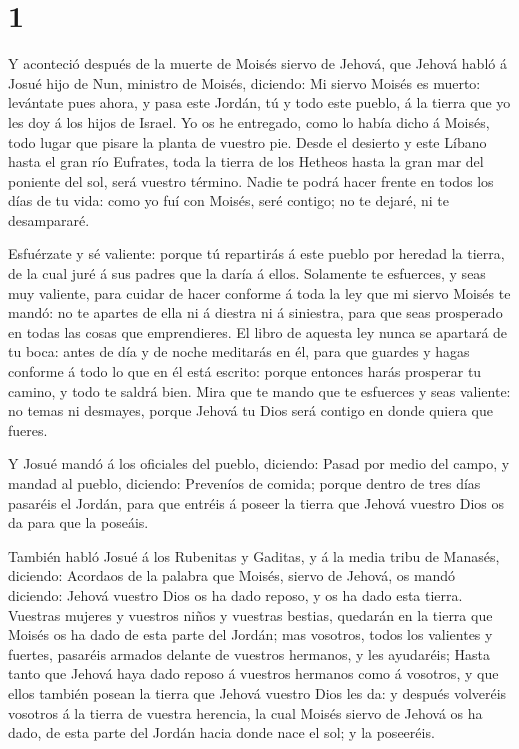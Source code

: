 \hypertarget{section}{%
\section{1}\label{section}}

 Y aconteció después de la muerte de Moisés siervo de
Jehová, que Jehová habló á Josué hijo de Nun, ministro de Moisés,
diciendo:  Mi siervo Moisés es muerto: levántate pues ahora,
y pasa este Jordán, tú y todo este pueblo, á la tierra que yo les doy á
los hijos de Israel.  Yo os he entregado, como lo había
dicho á Moisés, todo lugar que pisare la planta de vuestro pie.
 Desde el desierto y este Líbano hasta el gran río Eufrates,
toda la tierra de los Hetheos hasta la gran mar del poniente del sol,
será vuestro término.  Nadie te podrá hacer frente en todos
los días de tu vida: como yo fuí con Moisés, seré contigo; no te dejaré,
ni te desampararé.

 Esfuérzate y sé valiente: porque tú repartirás á este
pueblo por heredad la tierra, de la cual juré á sus padres que la daría
á ellos.  Solamente te esfuerces, y seas muy valiente, para
cuidar de hacer conforme á toda la ley que mi siervo Moisés te mandó: no
te apartes de ella ni á diestra ni á siniestra, para que seas prosperado
en todas las cosas que emprendieres.  El libro de aquesta
ley nunca se apartará de tu boca: antes de día y de noche meditarás en
él, para que guardes y hagas conforme á todo lo que en él está escrito:
porque entonces harás prosperar tu camino, y todo te saldrá bien.
 Mira que te mando que te esfuerces y seas valiente: no
temas ni desmayes, porque Jehová tu Dios será contigo en donde quiera
que fueres.

 Y Josué mandó á los oficiales del pueblo, diciendo:
 Pasad por medio del campo, y mandad al pueblo, diciendo:
Preveníos de comida; porque dentro de tres días pasaréis el Jordán, para
que entréis á poseer la tierra que Jehová vuestro Dios os da para que la
poseáis.

 También habló Josué á los Rubenitas y Gaditas, y á la
media tribu de Manasés, diciendo:  Acordaos de la palabra
que Moisés, siervo de Jehová, os mandó diciendo: Jehová vuestro Dios os
ha dado reposo, y os ha dado esta tierra.  Vuestras mujeres
y vuestros niños y vuestras bestias, quedarán en la tierra que Moisés os
ha dado de esta parte del Jordán; mas vosotros, todos los valientes y
fuertes, pasaréis armados delante de vuestros hermanos, y les ayudaréis;
 Hasta tanto que Jehová haya dado reposo á vuestros
hermanos como á vosotros, y que ellos también posean la tierra que
Jehová vuestro Dios les da: y después volveréis vosotros á la tierra de
vuestra herencia, la cual Moisés siervo de Jehová os ha dado, de esta
parte del Jordán hacia donde nace el sol; y la poseeréis.

